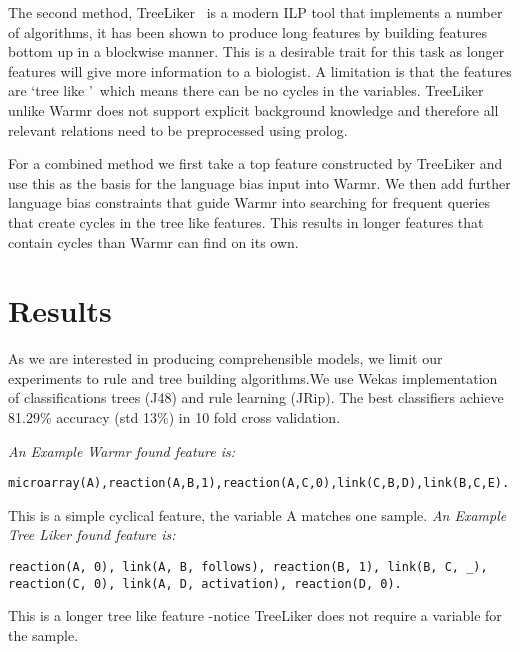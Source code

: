 \documentclass[runningheads,a4paper]{llncs}
\begin{document}
The second method, TreeLiker~\citep{vzelezny2013fast} is a modern ILP tool that implements a number of algorithms, it has been shown to produce long features by building features bottom up in a blockwise manner. This is a desirable trait for  this task as longer features will give more information to a biologist. A limitation is that the features are \lq tree like \rq\ which means there can be no cycles in the variables. TreeLiker unlike Warmr does not support explicit background knowledge and therefore all relevant relations need to be preprocessed using prolog.

For a combined method we first take a top feature constructed by TreeLiker and use this as the basis for the language bias input into Warmr. We then add further language bias constraints that guide Warmr into searching for frequent queries that create cycles in the tree like features. This results in longer features that contain cycles than Warmr can find on its own. 
	     
	     
\section{Results}
As we are interested in producing comprehensible models, we limit our experiments to rule and tree building algorithms.We use Wekas implementation of classifications trees (J48) and rule learning (JRip). The best classifiers achieve 81.29\% accuracy (std 13\%)  in 10 fold cross validation.
\newline

\noindent
{\it{An Example Warmr found feature is:}}
\begin{verbatim}
microarray(A),reaction(A,B,1),reaction(A,C,0),link(C,B,D),link(B,C,E).
\end{verbatim}
\noindent 
This is a simple cyclical feature, the variable A matches one sample. 
\newline
\newline
\newline
\newline
\noindent
{\it{An Example Tree Liker found feature is:}}

\begin{verbatim}
reaction(A, 0), link(A, B, follows), reaction(B, 1), link(B, C, _),    
reaction(C, 0), link(A, D, activation), reaction(D, 0).
\end{verbatim}
\noindent 
This is a longer tree like feature -notice TreeLiker does not require a variable for the sample.  
\newline
\end{document}
